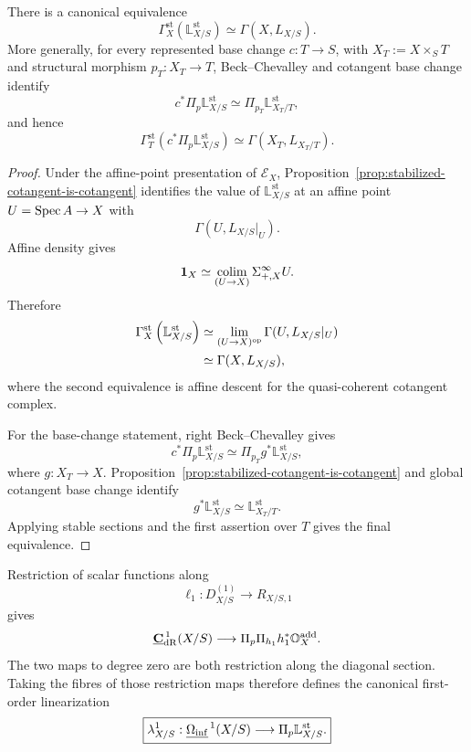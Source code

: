 \begin{corollary}
\label{cor:stabilized-cotangent-global-sections}
There is a canonical equivalence
\[
\boxed{
    \Gamma_X^{\mathrm{st}}
    \left(
        \mathbb L^{\mathrm{st}}_{X/S}
    \right)
    \simeq
    \Gamma(X,L_{X/S}).
}
\]
More generally, for every represented base change \(c:T\to S\), with
\(X_T:=X\times_ST\) and structural morphism \(p_T:X_T\to T\), Beck--Chevalley and cotangent
base change identify
\[
    c^*\Pi_p\mathbb L^{\mathrm{st}}_{X/S}
    \simeq
    \Pi_{p_T}\mathbb L^{\mathrm{st}}_{X_T/T},
\]
and hence
\[
\boxed{
    \Gamma_T^{\mathrm{st}}
    \left(
        c^*\Pi_p\mathbb L^{\mathrm{st}}_{X/S}
    \right)
    \simeq
    \Gamma(X_T,L_{X_T/T}).
}
\]
\end{corollary}

\begin{proof}
Under the affine-point presentation of \(\mathcal E_X\), Proposition~\ref{prop:stabilized-cotangent-is-cotangent}
identifies the value of \(\mathbb L^{\mathrm{st}}_{X/S}\) at an affine point
\(U=\operatorname{Spec} A\to X\) with
\[
    \Gamma(U,L_{X/S}|_U).
\]
Affine density gives
\[
    \mathbf1_X
    \simeq
    \operatorname*{colim}_{(U\to X)}
    \Sigma^\infty_{+,X}U.
\]
Therefore
\[
\begin{aligned}
    \Gamma_X^{\mathrm{st}}
    \left(
        \mathbb L^{\mathrm{st}}_{X/S}
    \right)
    &\simeq
    \operatorname*{lim}_{(U\to X)^{\mathrm{op}}}
    \Gamma(U,L_{X/S}|_U)
    \\
    &\simeq
    \Gamma(X,L_{X/S}),
\end{aligned}
\]
where the second equivalence is affine descent for the quasi-coherent cotangent complex.

For the base-change statement, right Beck--Chevalley gives
\[
    c^*\Pi_p\mathbb L^{\mathrm{st}}_{X/S}
    \simeq
    \Pi_{p_T}g^*\mathbb L^{\mathrm{st}}_{X/S},
\]
where \(g:X_T\to X\).  Proposition~\ref{prop:stabilized-cotangent-is-cotangent} and global cotangent
base change identify
\[
    g^*\mathbb L^{\mathrm{st}}_{X/S}
    \simeq
    \mathbb L^{\mathrm{st}}_{X_T/T}.
\]
Applying stable sections and the first assertion over \(T\) gives the final equivalence.
\end{proof}

\begin{construction}
\label{constr:first-order-linearization}
Restriction of scalar functions along
\[
    \ell_1:D^{(1)}_{X/S}\longrightarrow R_{X/S,1}
\]
gives
\[
    \underline{\mathbf C}_{\mathrm{dR}}^{\,1}(X/S)
    \longrightarrow
    \Pi_p\Pi_{h_1}h_1^*\mathbb O_X^{\mathrm{add}}.
\]
The two maps to degree zero are both restriction along the diagonal section.  Taking the fibres of
those restriction maps therefore defines the canonical first-order linearization
\[
\boxed{
    \lambda^1_{X/S}:
    \underline{\Omega_{\mathrm{inf}}}^{\,1}(X/S)
    \longrightarrow
    \Pi_p\mathbb L^{\mathrm{st}}_{X/S}.
}
\]
\end{construction}

